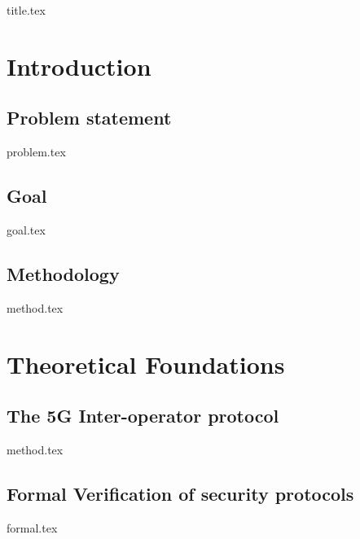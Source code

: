 \documentclass[a4paper,12pt,twoside]{report}
\begin{document}
{title.tex}
\pagestyle{empty}
\clearpage

{}
\pagestyle{plain}
\setcounter{page}{3}
\setcounter{tocdepth}{2}
\tableofcontents

\clearpage

\listoffigures

\listoftables

\printglossary

\printglossary[type=\acronymtype,title=Acronyms]

\chapter{Introduction}
\label{chap:intro}

\section{Problem statement}
\label{sec:problem}
{problem.tex}

\section{Goal}
\label{sec:goal}
{goal.tex}

\section{Methodology}
\label{sec:method}
{method.tex}

\clearpage

\chapter{Theoretical Foundations}
\label{chap:theory}

\section{The 5G Inter-operator protocol}
\label{sec:method}
{method.tex}

\section{Formal Verification of security protocols}
\label{sec:method}
{formal.tex}
\end{document}
